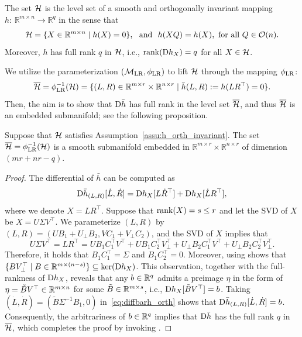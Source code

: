 \begin{assumption}{\cite[Assumption~1]{yang2025spacedecouple}}\label{assu:h_orth_invariant}
    The set $\mathcal{H}$ is the level set of a smooth and orthogonally invariant mapping $h:\,\mathbb{R}^{m\times n}\rightarrow \mathbb{R}^{q}$ in the sense that 
    \begin{equation}\label{eq:orth_invariant_h}
       \mathcal{H}=\{X\in\mathbb{R}^{m\times n}\mid h(X)=0\},\ \ \text{and}\ \  h(XQ) = h(X),\ \text{for all}\ Q\in\mathcal{O}(n).
    \end{equation}
    Moreover, $h$ has full rank $q$ in $\mathcal{H}$, i.e., $\operatorname{rank}(\mathrm{D} h_X)=q$ for {all} $X\in\mathcal{H}$.
\end{assumption}
We utilize the parameterization $(\mathcal{M}_{\mathrm{LR}},\phi_{\mathrm{LR}})$ to lift $\mathcal{H}$ through the mapping $\phi_{\mathrm{LR}}$:
\begin{equation}\label{eq:barH_orth}
    \overline{\mathcal{H}} = \phi_{\mathrm{LR}}^{-1}(\mathcal{H})=\{(L,R)\in\mathbb{R}^{m\times r}\times \mathbb{R}^{n\times r}\mid \bar{h}(L,R):=h(LR^\top)=0\}.
\end{equation}
Then, the aim is to show that $\mathrm{D} \bar{h}$ has full rank in the level set $\overline{\mathcal{H}}$, and thus $\overline{\mathcal{H}}$ is an embedded submanifold; see the following proposition.
\begin{proposition}\label{pro:manifold_orth_inv}
    Suppose that $\mathcal{H}$ satisfies Assumption~\ref{assu:h_orth_invariant}. The set $\overline{\mathcal{H}} = \phi_{\mathrm{LR}}^{-1}(\mathcal{H})$ is a smooth submanifold embedded in $\mathbb{R}^{m\times r}\times\mathbb{R}^{n\times r}$ of dimension $(mr+nr-q)$.
\end{proposition}
\begin{proof}
The differential of $\bar{h}$ can be computed as
\begin{equation}\label{eq:diffbarh_orth}
    \mathrm{D} \bar{h}_{(L,R)}[\dot{L},\dot{R}]=\mathrm{D} h_X[L\dot{R}^\top] + \mathrm{D} h_X[\dot{L}R^\top], 
\end{equation}
where we denote $X=LR^\top$. Suppose that $\operatorname{rank}(X)=s\le r$ and let the SVD of $X$ be $X=U\varSigma V^\top$. We parameterize $(L,R)$ by $(L,R)=(UB_1+U_\bot B_2, VC_1+V_\bot C_2)$, and the SVD of $X$ implies that
\begin{equation*}
    U\varSigma V^\top = LR^\top = UB_1C^\top_1 V^\top + UB_1C_2^\top V_\bot^\top + U_\bot B_2C_1^\top V^\top + U_\bot B_2 C_2^\top V_\bot^\top.
\end{equation*}
Therefore, it holds that $B_1^{}C_1^\top=\varSigma$ and $B_1^{}C_2^\top=0$. Moreover, using \cite[Proposition~1]{yang2025spacedecouple} shows that $\{BV^\top_\bot\mid B\in\mathbb{R}^{m\times(n-s)}\} \subseteq\operatorname{ker}(\mathrm{D} {h}_X)$. This observation, together with the full-rankness of $\mathrm{D} h_X$, reveals that any $b\in\mathbb{R}^q$ admits a preimage $\eta$ in the form of $\eta = \tilde{B}V^\top \in\mathbb{R}^{m\times n}$ for some $\tilde{B}\in\mathbb{R}^{m\times s}$, i.e., $\mathrm{D} h_{X}[\tilde{B}V^\top] =b$. Taking $(\dot{L},\dot{R})=(\tilde{B}\varSigma^{-1}B_1,0)$ in~\eqref{eq:diffbarh_orth} shows that $\mathrm{D}\bar{h}_{(L,R)}[\dot{L},\dot{R}]=b$. Consequently, the arbitrariness of $b\in\mathbb{R}^q$ implies that $\mathrm{D} \bar{h}$ has the full rank $q$ in $\overline{\mathcal{H}}$, which completes the proof by invoking \cite[Corollary 5.14]{lee2012manifolds}.
\end{proof}

